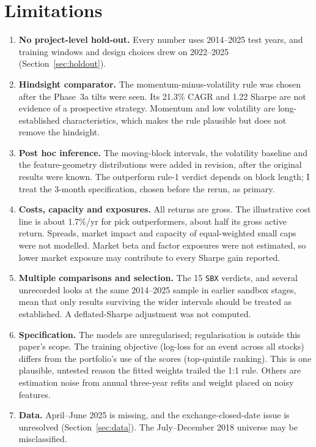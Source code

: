 \documentclass[11pt]{article}
\begin{document}
\section{Limitations}
\label{sec:limits}
\begin{enumerate}
\item \textbf{No project-level hold-out.} Every number uses 2014--2025 test years, and training windows and design choices drew on 2022--2025 (Section~\ref{sec:holdout}).
\item \textbf{Hindsight comparator.} The momentum-minus-volatility rule was chosen after the Phase~3a tilts were seen. Its 21.3\% CAGR and 1.22 Sharpe are not evidence of a prospective strategy. Momentum \citep{jegadeesh1993} and low volatility \citep{ang2006} are long-established characteristics, which makes the rule plausible but does not remove the hindsight.
\item \textbf{Post hoc inference.} The moving-block intervals, the volatility baseline and the feature-geometry distributions were added in revision, after the original results were known. The outperform rule-1 verdict depends on block length; I treat the 3-month specification, chosen before the rerun, as primary.
\item \textbf{Costs, capacity and exposures.} All returns are gross. The illustrative cost line is about 1.7\%/yr for pick outperformers, about half its gross active return. Spreads, market impact and capacity of equal-weighted small caps were not modelled. Market beta and factor exposures were not estimated, so lower market exposure may contribute to every Sharpe gain reported.
\item \textbf{Multiple comparisons and selection.} The 15 \texttt{SBX} verdicts, and several unrecorded looks at the same 2014--2025 sample in earlier sandbox stages, mean that only results surviving the wider intervals should be treated as established. A deflated-Sharpe adjustment \citep{bailey2014} was not computed.
\item \textbf{Specification.} The models are unregularised; regularisation is outside this paper's scope. The training objective (log-loss for an event across all stocks) differs from the portfolio's use of the scores (top-quintile ranking). This is one plausible, untested reason the fitted weights trailed the 1:1 rule. Others are estimation noise from annual three-year refits and weight placed on noisy features.
\item \textbf{Data.} April--June 2025 is missing, and the exchange-closed-date issue is unresolved (Section~\ref{sec:data}). The July--December 2018 universe may be misclassified.
\end{enumerate}
\end{document}

